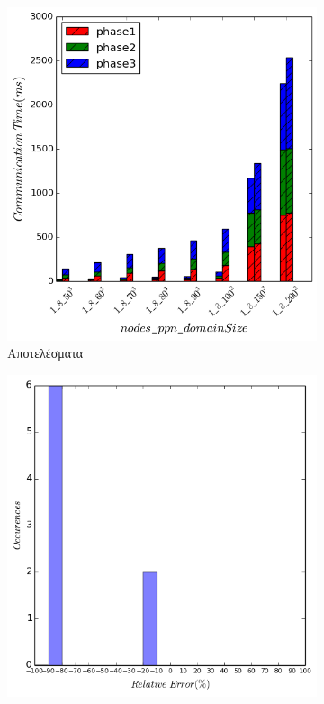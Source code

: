 \begin{figure}[H]
    \centering
    \captionsetup{justification=centering,margin=0cm,font=footnotesize}
    \begin{subfigure}[b]{0.47\textwidth}
    \includegraphics[width=\textwidth]{./images/NB_UMA/NB_lulesh_res.png}
    \caption{Αποτελέσματα}
    \label{fig:NB_lulesh_UMA_res}
    \end{subfigure}
    \quad %
    \begin{subfigure}[b]{0.47\textwidth}
        \includegraphics[width=\textwidth]{./images/NB_UMA/NB_lulesh_err_dist.png}

\end{subfigure}
\end{figure}
